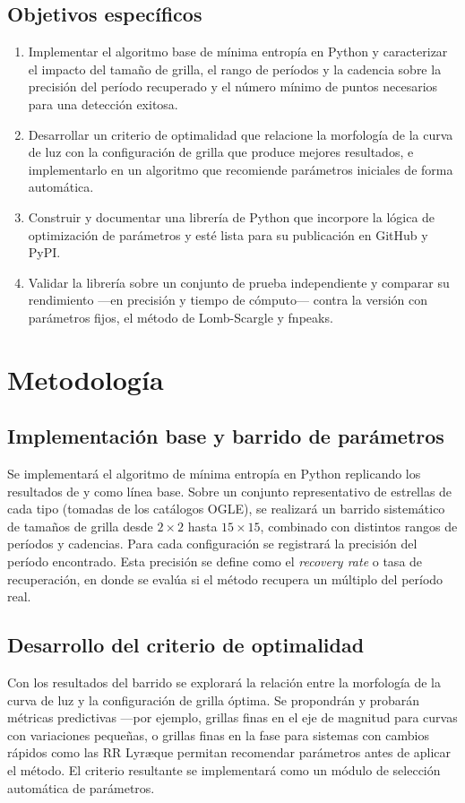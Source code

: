 \documentclass[12pt,letterpaper,oneside]{book}
\begin{document}
\section{Objetivos específicos}
\begin{enumerate}
    \item Implementar el algoritmo base de mínima entropía en Python y caracterizar el impacto del tamaño de grilla, el rango de períodos y la cadencia sobre la precisión del período recuperado y el número mínimo de puntos necesarios para una detección exitosa.

    \item Desarrollar un criterio de optimalidad que relacione la morfología de la curva de luz con la configuración de grilla que produce mejores resultados, e implementarlo en un algoritmo que recomiende parámetros iniciales de forma automática.

    \item Construir y documentar una librería de Python que incorpore la lógica de optimización de parámetros y esté lista para su publicación en GitHub y PyPI.

    \item Validar la librería sobre un conjunto de prueba independiente y comparar su rendimiento ---en precisión y tiempo de cómputo--- contra la versión con parámetros fijos, el método de Lomb-Scargle y fnpeaks.
\end{enumerate}

\chapter{Metodología}
\section{Implementación base y barrido de parámetros}
Se implementará el algoritmo de mínima entropía en Python replicando los resultados de \cite{cincotta1995astronomical} y \cite{cubillos2021} como línea base. Sobre un conjunto representativo de estrellas de cada tipo (tomadas de los catálogos OGLE), se realizará un barrido sistemático de tamaños de grilla desde $2\times2$ hasta $15\times15$, combinado con distintos rangos de períodos y cadencias. Para cada configuración se registrará la precisión del período encontrado. Esta precisión se define como el \textit{recovery rate} o tasa de recuperación, en donde se evalúa si el método recupera un múltiplo del período real. 

\section{Desarrollo del criterio de optimalidad}
Con los resultados del barrido se explorará la relación entre la morfología de la curva de luz y la configuración de grilla óptima. Se propondrán y probarán métricas predictivas ---por ejemplo, grillas finas en el eje de magnitud para curvas con variaciones pequeñas, o grillas finas en la fase para sistemas con cambios rápidos como las RR Lyr\ae que permitan recomendar parámetros antes de aplicar el método. El criterio resultante se implementará como un módulo de selección automática de parámetros.
\end{document}
